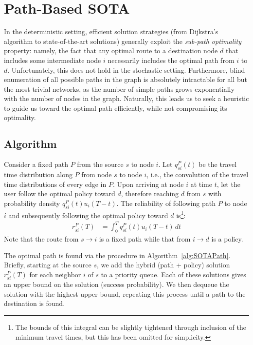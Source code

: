 \documentclass[oribibl]{llncs}
\begin{document}
	\section{Path-Based SOTA}

			In the deterministic setting, efficient solution strategies (from Dijkstra's
			algorithm to state-of-the-art solutions) generally exploit the \textit{sub-path optimality} property:
			namely, the fact that any optimal route to a destination node $d$ that includes some intermediate node $i$
			necessarily includes the optimal path from $i$ to $d$.
			Unfortunately, this does not hold in the stochastic setting.
			Furthermore, blind enumeration of all possible paths in the graph is
			absolutely intractable for all but the most trivial networks,
			as the number of simple paths grows exponentially with the number of nodes in the graph.
			Naturally, this leads us to seek a heuristic to guide us toward the optimal path
			efficiently, while not compromising its optimality.

		\subsection{Algorithm}

			Consider a fixed path $P$ from the source $s$ to node $i$.
			Let $q^{P}_{si}(t)$ be the travel time distribution along $P$ from node $s$ to node $i$,
			i.e., the convolution of the travel time distributions of every edge in $P$.
			Upon arriving at node $i$ at time $t$, let the user follow the optimal policy
			toward $d$, therefore reaching $d$ from $s$ with probability density
			$q^{P}_{si}(t) u_i(T - t)$.
			The reliability of following path $P$ to node $i$ and subsequently
			following the optimal policy toward $d$ is\footnote
			{
				The bounds of this integral can be slightly tightened through
				inclusion of the minimum travel times, but this has been omitted for simplicity.
			}:
			\begin{align*}
				r^{P}_{si}(T) &= \int_{0}^{T} q^{P}_{si}(t) u_i(T - t) \,dt
			\end{align*}
			Note that the route from $s \rightarrow i$ is a fixed path while that from
			$i \rightarrow d$ is a policy.

			The optimal path is found via the procedure in Algorithm~\ref{alg:SOTAPath}.
			Briefly, starting at the source $s$, we add the hybrid (path + policy)
			solution $r^{P}_{si}(T)$ for each neighbor $i$ of $s$ to a priority queue.
			Each of these solutions gives an upper bound on the solution (success probability).
			We then dequeue the solution with the highest upper bound,
			repeating this process until a path to the destination is found.
\end{document}
